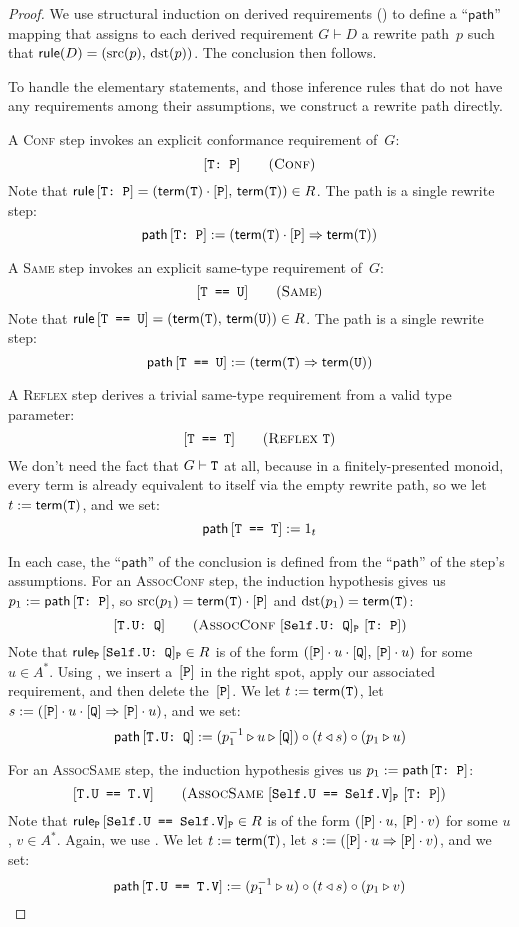 \documentclass[../generics]{subfiles}
\begin{document}
\begin{proof}
We use structural induction on derived requirements () to define a ``$\mathsf{path}$'' mapping that assigns to each derived requirement $G\vdash D$ a rewrite path~$p$ such that $\mathsf{rule}(D)=(\operatorname{src}(p),\,\operatorname{dst}(p))$. The conclusion then follows.

\BaseCase To handle the elementary statements, and those inference rules that do not have any requirements among their assumptions, we construct a rewrite path directly.

A \textsc{Conf} step invokes an explicit conformance requirement of~$G$:
\[\ConfStepDef\]
Note that $\mathsf{rule}\,[\texttt{T:~P}]=(\mathsf{term}(\texttt{T})\cdot[\texttt{P}],\,\mathsf{term}(\texttt{T}))\in R$. The path is a single rewrite step:
\[\mathsf{path}\, [\texttt{T:~P}] := (\mathsf{term}(\texttt{T})\cdot[\texttt{P}] \Rightarrow \mathsf{term}(\texttt{T}))\]

A \textsc{Same} step invokes an explicit same-type requirement of~$G$:
\[\SameStepDef\]
Note that $\mathsf{rule}\,[\texttt{T == U}]=(\mathsf{term}(\texttt{T}),\,\mathsf{term}(\texttt{U}))\in R$. The path is a single rewrite step:
\[\mathsf{path}\, [\texttt{T == U}] := (\mathsf{term}(\texttt{T}) \Rightarrow \mathsf{term}(\texttt{U}))\]

A \textsc{Reflex} step derives a trivial same-type requirement from a valid type parameter:
\[\ReflexStepDef\]
We don't need the fact that $G\vdash\texttt{T}$ at all, because in a finitely-presented monoid, every term is already equivalent to itself via the empty rewrite path, so we let $t := \mathsf{term}(\texttt{T})$, and we set:
\[\mathsf{path}\, [\texttt{T == T}] := 1_t\]

\InductiveStep In each case, the ``$\mathsf{path}$'' of the conclusion is defined from the ``$\mathsf{path}$'' of the step's assumptions. For an \textsc{AssocConf} step, the induction hypothesis gives us $p_1 := \mathsf{path}\,[\texttt{T:~P}]$, so $\operatorname{src}(p_1)=\mathsf{term}(\texttt{T})\cdot[\texttt{P}]$ and $\operatorname{dst}(p_1)=\mathsf{term}(\texttt{T})$:
\[\AssocConfStepDef\]
Note that $\mathsf{rule}_{\texttt{P}}\,[\texttt{Self.U:~Q}]_{\texttt{P}}\in R$ is of the form $([\texttt{P}]\cdot u\cdot[\texttt{Q}],\,[\texttt{P}]\cdot u)$ for some $u\in A^*$. Using , we insert a~$[\texttt{P}]$ in the right spot, apply our associated requirement, and then delete the~$[\texttt{P}]$. We let $t := \mathsf{term}(\texttt{T})$, let $s := ([\texttt{P}] \cdot u \cdot [\texttt{Q}] \Rightarrow [\texttt{P}] \cdot u)$, and we set:
\[
\mathsf{path}\, [\texttt{T.U:~Q}] := (p_1^{-1} \triangleright u \triangleright [\texttt{Q}])
\circ
(t \triangleleft s)
\circ
(p_1 \triangleright u)
\]

For an \textsc{AssocSame} step, the induction hypothesis gives us $p_1 := \mathsf{path}\, [\texttt{T:~P}]$:
\[\AssocSameStepDef\]
Note that $\mathsf{rule}_{\texttt{P}}\,[\texttt{Self.U == Self.V}]_{\texttt{P}}\in R$ is of the form $([\texttt{P}]\cdot u,\,[\texttt{P}]\cdot v)$ for some $u$, $v\in A^*$. Again, we use . We let $t := \mathsf{term}(\texttt{T})$, let $s := ([\texttt{P}] \cdot u \Rightarrow [\texttt{P}] \cdot v)$, and we set:
\[
\mathsf{path}\, [\texttt{T.U == T.V}] := (p_1^{-1} \triangleright u)
\circ
(t \triangleleft s)
\circ
(p_1 \triangleright v)
\]


\end{proof}
\end{document}
